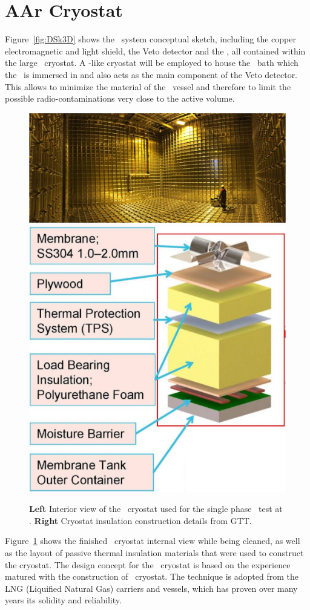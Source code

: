 \section{AAr Cryostat}
\label{sec:Cryostat}

Figure~\ref{fig:DSk3D} shows the \DSk\ system conceptual sketch, including the copper electromagnetic and light shield, the Veto detector and the \LArTPC, all contained within the large \AAr\ cryostat.  A \pDUNE-like cryostat will be employed to house the \LAr\ bath which the \TPC\ is immersed in and also acts as the main component of the Veto detector. This allows to minimize the material of the \TPC\ vessel and therefore to limit the possible radio-contaminations very close to the active volume.  

\begin{figure}[!t]
\includegraphics[height=0.30\textwidth]{./Figures/ProtoDUNE-Cryostat-Inner-Photo.jpg}
\includegraphics[height=0.30\textwidth]{./Figures/Membrane-concept.jpg}
\caption[Details of the \AAr\ cryostat]{{\bf Left} Interior view of the \pDUNE\ cryostat used for the single phase \LArTPC\ test at \CERN.  {\bf Right} Cryostat insulation construction details from GTT.}
\label{fig:Cryostat}
\end{figure}

Figure~\ref{fig:Cryostat} shows the finished \pDUNE\ cryostat internal view while being cleaned, as well as the layout of passive thermal insulation materials that were used to construct the cryostat.  The design concept for the \DSks\ cryostat is based on the experience matured with the construction of \pDUNE\ cryostat. The technique is adopted from the LNG (Liquified Natural Gas) carriers and vessels, which has proven over many years its solidity and reliability. 

